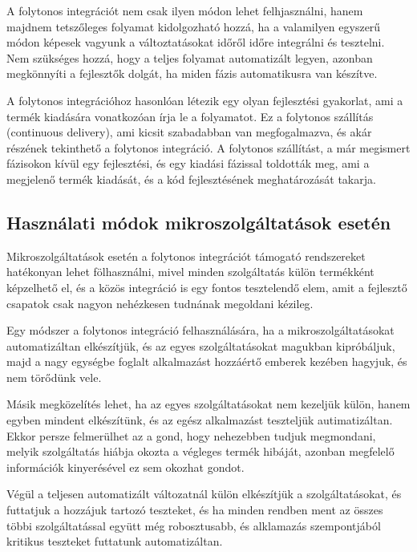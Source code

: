 \documentclass[11pt,magyar,a4paper,twoside,]{report}
\begin{document}
A folytonos integrációt nem csak ilyen módon lehet felhjasználni, hanem
majdnem tetszőleges folyamat kidolgozható hozzá, ha a valamilyen
egyszerű módon képesek vagyunk a változtatásokat időről időre integrálni
és tesztelni. Nem szükséges hozzá, hogy a teljes folyamat automatizált
legyen, azonban megkönnyíti a fejlesztők dolgát, ha miden fázis
automatikusra van készítve.

A folytonos integrációhoz hasonlóan létezik egy olyan fejlesztési
gyakorlat, ami a termék kiadására vonatkozóan írja le a folyamatot. Ez a
folytonos szállítás\citep{continuous-delivery} (continuous delivery),
ami kicsit szabadabban van megfogalmazva, és akár részének tekinthető a
folytonos integráció. A folytonos szállítást, a már megismert fázisokon
kívül egy fejlesztési, és egy kiadási fázissal toldották meg, ami a
megjelenő termék kiadását, és a kód fejlesztésének meghatározását
takarja.

\subsection{Használati módok mikroszolgáltatások
esetén}\label{hasznuxe1lati-muxf3dok-mikroszolguxe1ltatuxe1sok-esetuxe9n}

Mikroszolgáltatások esetén a folytonos integrációt támogató rendszereket
hatékonyan lehet fölhasználni, mivel minden szolgáltatás külön
termékként képzelhető el, és a közös integráció is egy fontos
tesztelendő elem, amit a fejlesztő csapatok csak nagyon nehézkesen
tudnának megoldani kézileg.

Egy módszer a folytonos integráció felhasználására, ha a
mikroszolgáltatásokat automatizáltan elkészítjük, és az egyes
szolgáltatásokat magukban kipróbáljuk, majd a nagy egységbe foglalt
alkalmazást hozzáértő emberek kezében hagyjuk, és nem törődünk vele.

Másik megközelítés lehet, ha az egyes szolgáltatásokat nem kezeljük
külön, hanem egyben mindent elkészítünk, és az egész alkalmazást
teszteljük autimatizáltan. Ekkor persze felmerülhet az a gond, hogy
nehezebben tudjuk megmondani, melyik szolgáltatás hiábja okozta a
végleges termék hibáját, azonban megfelelő információk kinyerésével ez
sem okozhat gondot.

Végül a teljesen automatizált változatnál külön elkészítjük a
szolgáltatásokat, és futtatjuk a hozzájuk tartozó teszteket, és ha
minden rendben ment az összes többi szolgáltatással együtt még
robosztusabb, és alklamazás szempontjából kritikus teszteket futtatunk
automatizáltan.
\end{document}
